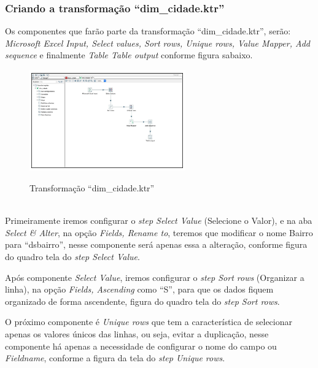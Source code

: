 \subsubsection{Criando a transforma\c{c}\~{a}o ``dim\_cidade.ktr''}

Os componentes que far\~{a}o parte da transforma\c{c}\~{a}o ``dim\_cidade.ktr'', ser\~{a}o: \textit{Microsoft Excel Input, Select values, Sort rows, Unique rows, Value Mapper, Add sequence} e finalmente \textit{Table Table output} conforme figura sabaixo. 

\begin{figure}[H]
	\vspace*{0,2cm}
    \centering
    \caption{Transforma\c{c}\~{a}o ``dim\_cidade.ktr''}
    \includegraphics[width=0.6\textwidth]{./04-figuras/figura-trans-dim-cidade}
    \label{fig:ilustfigtransdimcidade}
\end{figure}
\vspace*{-0,9cm}
{\raggedright {}} \\

Primeiramente iremos configurar o \textit{step Select Value} (Selecione o Valor), e na aba \textit{Select & Alter}, na op\c{c}\~{a}o \textit{Fields, Rename to}, teremos que modificar o nome Bairro para ``ds\-bairro'', nesse componente ser\'{a} apenas essa a altera\c{c}\~{a}o, conforme figura do quadro tela do \textit{step Select Value}.

Ap\'os  componente \textit{Select Value}, iremos configurar o \textit{step Sort rows} (Organizar a linha), na op\c{c}\~{a}o \textit{Fields, Ascending} como ``S'', para que os dados fiquem organizado de forma ascendente, figura do quadro tela do \textit{step Sort rows}.

O pr\'oximo componente \'{e} \textit{Unique rows} que tem a caracter\'{i}stica de selecionar apenas os valores únicos das linhas, ou seja, evitar a duplica\c{c}\~{a}o, nesse componente h\'{a} apenas a necessidade de configurar o nome do campo ou \textit{Fieldname}, conforme a figura da tela do \textit{step Unique rows}.

